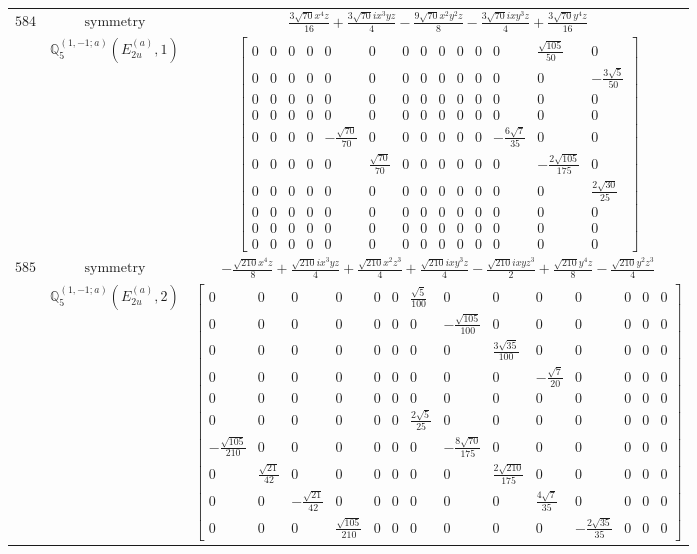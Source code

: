 \documentclass[fleqn,8pt,landscape]{jsarticle}
\begin{document}
\begin{longtable}{ccc}
$ 584 $ & $ \text{symmetry} $ & $ \frac{3 \sqrt{70} x^{4} z}{16} + \frac{3 \sqrt{70} i x^{3} y z}{4} - \frac{9 \sqrt{70} x^{2} y^{2} z}{8} - \frac{3 \sqrt{70} i x y^{3} z}{4} + \frac{3 \sqrt{70} y^{4} z}{16} $ \\
$  $ & $ \mathbb{Q}_{5}^{(1,-1;a)}(E_{2u}^{(a)},1) $ & $ \begin{bmatrix} 0 & 0 & 0 & 0 & 0 & 0 & 0 & 0 & 0 & 0 & 0 & 0 & \frac{\sqrt{105}}{50} & 0 \\ 0 & 0 & 0 & 0 & 0 & 0 & 0 & 0 & 0 & 0 & 0 & 0 & 0 & - \frac{3 \sqrt{5}}{50} \\ 0 & 0 & 0 & 0 & 0 & 0 & 0 & 0 & 0 & 0 & 0 & 0 & 0 & 0 \\ 0 & 0 & 0 & 0 & 0 & 0 & 0 & 0 & 0 & 0 & 0 & 0 & 0 & 0 \\ 0 & 0 & 0 & 0 & - \frac{\sqrt{70}}{70} & 0 & 0 & 0 & 0 & 0 & 0 & - \frac{6 \sqrt{7}}{35} & 0 & 0 \\ 0 & 0 & 0 & 0 & 0 & \frac{\sqrt{70}}{70} & 0 & 0 & 0 & 0 & 0 & 0 & - \frac{2 \sqrt{105}}{175} & 0 \\ 0 & 0 & 0 & 0 & 0 & 0 & 0 & 0 & 0 & 0 & 0 & 0 & 0 & \frac{2 \sqrt{30}}{25} \\ 0 & 0 & 0 & 0 & 0 & 0 & 0 & 0 & 0 & 0 & 0 & 0 & 0 & 0 \\ 0 & 0 & 0 & 0 & 0 & 0 & 0 & 0 & 0 & 0 & 0 & 0 & 0 & 0 \\ 0 & 0 & 0 & 0 & 0 & 0 & 0 & 0 & 0 & 0 & 0 & 0 & 0 & 0 \end{bmatrix} $ \\ \hline
$ 585 $ & $ \text{symmetry} $ & $ - \frac{\sqrt{210} x^{4} z}{8} + \frac{\sqrt{210} i x^{3} y z}{4} + \frac{\sqrt{210} x^{2} z^{3}}{4} + \frac{\sqrt{210} i x y^{3} z}{4} - \frac{\sqrt{210} i x y z^{3}}{2} + \frac{\sqrt{210} y^{4} z}{8} - \frac{\sqrt{210} y^{2} z^{3}}{4} $ \\
$  $ & $ \mathbb{Q}_{5}^{(1,-1;a)}(E_{2u}^{(a)},2) $ & $ \begin{bmatrix} 0 & 0 & 0 & 0 & 0 & 0 & \frac{\sqrt{5}}{100} & 0 & 0 & 0 & 0 & 0 & 0 & 0 \\ 0 & 0 & 0 & 0 & 0 & 0 & 0 & - \frac{\sqrt{105}}{100} & 0 & 0 & 0 & 0 & 0 & 0 \\ 0 & 0 & 0 & 0 & 0 & 0 & 0 & 0 & \frac{3 \sqrt{35}}{100} & 0 & 0 & 0 & 0 & 0 \\ 0 & 0 & 0 & 0 & 0 & 0 & 0 & 0 & 0 & - \frac{\sqrt{7}}{20} & 0 & 0 & 0 & 0 \\ 0 & 0 & 0 & 0 & 0 & 0 & 0 & 0 & 0 & 0 & 0 & 0 & 0 & 0 \\ 0 & 0 & 0 & 0 & 0 & 0 & \frac{2 \sqrt{5}}{25} & 0 & 0 & 0 & 0 & 0 & 0 & 0 \\ - \frac{\sqrt{105}}{210} & 0 & 0 & 0 & 0 & 0 & 0 & - \frac{8 \sqrt{70}}{175} & 0 & 0 & 0 & 0 & 0 & 0 \\ 0 & \frac{\sqrt{21}}{42} & 0 & 0 & 0 & 0 & 0 & 0 & \frac{2 \sqrt{210}}{175} & 0 & 0 & 0 & 0 & 0 \\ 0 & 0 & - \frac{\sqrt{21}}{42} & 0 & 0 & 0 & 0 & 0 & 0 & \frac{4 \sqrt{7}}{35} & 0 & 0 & 0 & 0 \\ 0 & 0 & 0 & \frac{\sqrt{105}}{210} & 0 & 0 & 0 & 0 & 0 & 0 & - \frac{2 \sqrt{35}}{35} & 0 & 0 & 0 \end{bmatrix} $ \\ \hline

\end{longtable}
\end{document}
